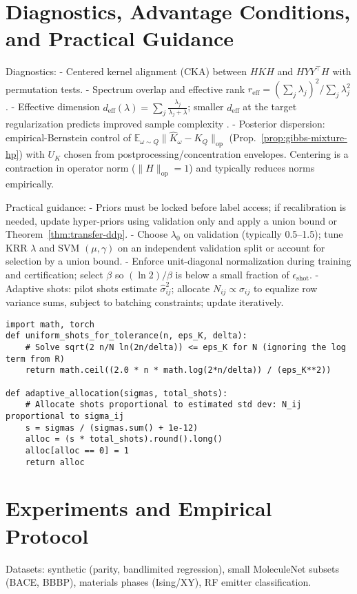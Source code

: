 \documentclass{article}
\begin{document}
\section{Diagnostics, Advantage Conditions, and Practical Guidance}\label{sec:diagnostics}
Diagnostics:
- Centered kernel alignment (CKA) between $HKH$ and $HYY^\top H$ with permutation tests.
- Spectrum overlap and effective rank $r_{\mathrm{eff}}=(\sum_j \lambda_j)^2/\sum_j \lambda_j^2$.
- Effective dimension $d_{\mathrm{eff}}(\lambda)=\sum_j \frac{\lambda_j}{\lambda_j+\lambda}$; smaller $d_{\mathrm{eff}}$ at the target regularization predicts improved sample complexity \cite{bach2013sharp, rudi2015less, hsu2014random, bartlett2020benign}.
- Posterior dispersion: empirical-Bernstein control of $\mathbb{E}_{\omega\sim Q}\|\widehat{K}_\omega-K_Q\|_{\mathrm{op}}$ (Prop.~\ref{prop:gibbs-mixture-hp}) with $U_K$ chosen from postprocessing/concentration envelopes. Centering is a contraction in operator norm ($\|H\|_{\mathrm{op}}=1$) and typically reduces norms empirically.

Practical guidance:
- Priors must be locked before label access; if recalibration is needed, update hyper-priors using validation only and apply a union bound or Theorem~\ref{thm:transfer-ddp}.
- Choose $\lambda_0$ on validation (typically 0.5–1.5); tune KRR $\lambda$ and SVM $(\mu,\gamma)$ on an independent validation split or account for selection by a union bound.
- Enforce unit-diagonal normalization during training and certification; select $\beta$ so $(\ln 2)/\beta$ is below a small fraction of $\epsilon_{\mathrm{shot}}$.
- Adaptive shots: pilot shots estimate $\hat{\sigma}^2_{ij}$; allocate $N_{ij}\propto \hat{\sigma}_{ij}$ to equalize row variance sums, subject to batching constraints; update iteratively.

\begin{lstlisting}[style=py, caption={Shot-budget helper and adaptive allocation.}]
import math, torch
def uniform_shots_for_tolerance(n, eps_K, delta):
    # Solve sqrt(2 n/N ln(2n/delta)) <= eps_K for N (ignoring the log term from R)
    return math.ceil((2.0 * n * math.log(2*n/delta)) / (eps_K**2))

def adaptive_allocation(sigmas, total_shots):
    # Allocate shots proportional to estimated std dev: N_ij proportional to sigma_ij
    s = sigmas / (sigmas.sum() + 1e-12)
    alloc = (s * total_shots).round().long()
    alloc[alloc == 0] = 1
    return alloc
\end{lstlisting}

\section{Experiments and Empirical Protocol}\label{sec:experiments}
Datasets: synthetic (parity, bandlimited regression), small MoleculeNet subsets (BACE, BBBP), materials phases (Ising/XY), RF emitter classification.
\end{document}
